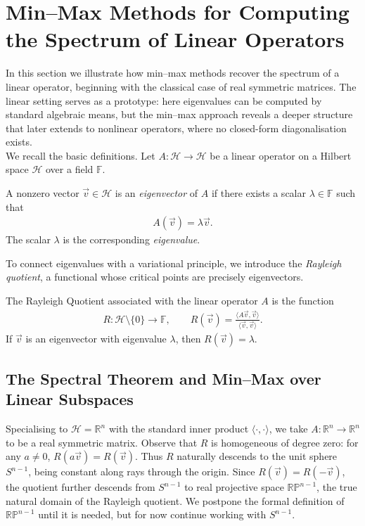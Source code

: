 \chapter{Min--Max Methods for Computing the Spectrum of Linear Operators}
\label{ch:2}
In this section we illustrate how min--max methods recover the spectrum of a linear operator, beginning with the classical case of real symmetric matrices. 
The linear setting serves as a prototype: here eigenvalues can be computed by standard algebraic means, but the min--max approach reveals a deeper structure that later extends to nonlinear operators, where no closed-form diagonalisation exists.\\
We recall the basic definitions. Let $A:\mathcal{H}\to\mathcal{H}$ be a linear operator on a Hilbert space $\mathcal{H}$ over a field $\mathbb{F}$.

\begin{definition}\label{eigen}
A nonzero vector $\vec v \in \mathcal H$ is an \emph{eigenvector} of $A$ if there exists a scalar $\lambda \in \mathbb{F}$ such that 
\begin{align*}
A(\vec v) = \lambda \vec v.
\end{align*}
The scalar $\lambda$ is the corresponding \emph{eigenvalue}.
\end{definition}

\noindent To connect eigenvalues with a variational principle, we introduce the \emph{Rayleigh quotient}, a functional whose critical points are precisely eigenvectors. 

\begin{definition} 
The Rayleigh Quotient associated with the linear operator $A$ is the function  
\begin{align*}
    R:\mathcal{H}\setminus\{0\}\to \mathbb{F}, \qquad
R(\vec v) = \frac{\langle A\vec v, \vec v\rangle}{\langle \vec v, \vec v\rangle}.
\end{align*}
If $\vec{v}$ is an eigenvector with eigenvalue $\lambda$, then $R(\vec{v})=\lambda$.
\end{definition}


\section{The Spectral Theorem and Min--Max over Linear Subspaces}
\noindent Specialising to $\mathcal{H} = \mathbb{R}^n$ with the standard inner product $\langle \cdot,\cdot\rangle$, we take $A:\mathbb{R}^n\to\mathbb{R}^n$ to be a real symmetric matrix. 
Observe that $R$ is homogeneous of degree zero: for any $a \neq 0$, $R(a\vec v) = R(\vec v)$. Thus $R$ naturally descends to the unit sphere $S^{n-1}$, being constant along rays through the origin.
Since $R(\vec v) = R(-\vec v)$, the quotient further descends from $S^{n-1}$ to real projective space $\mathbb{RP}^{n-1}$, the true natural domain of the Rayleigh quotient. We postpone the formal definition of $\mathbb{RP}^{n-1}$ until it is needed, but for now continue working with $S^{n-1}$.

